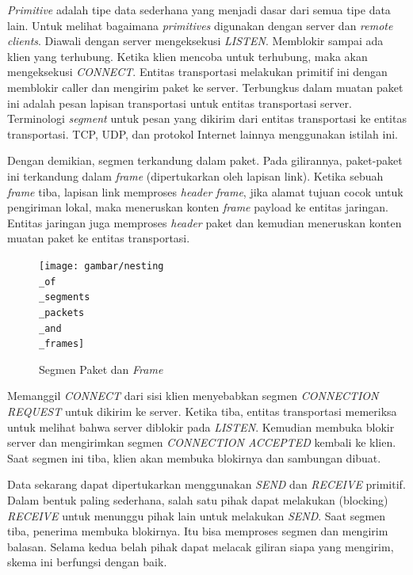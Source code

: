 \emph{Primitive} adalah tipe data sederhana yang menjadi dasar dari semua tipe data lain. Untuk melihat bagaimana \emph{primitives} digunakan dengan server dan \emph{remote clients}. Diawali dengan server mengeksekusi \emph{LISTEN}. Memblokir sampai ada klien yang terhubung. Ketika klien mencoba untuk terhubung, maka akan mengeksekusi \emph{CONNECT}. Entitas transportasi melakukan primitif ini dengan memblokir caller dan mengirim paket ke server. Terbungkus dalam muatan paket ini adalah pesan lapisan transportasi untuk entitas transportasi server. Terminologi \emph{segment} untuk pesan yang dikirim dari entitas transportasi ke entitas transportasi. TCP, UDP, dan protokol Internet lainnya menggunakan istilah ini.

Dengan demikian, segmen terkandung dalam paket. Pada gilirannya, paket-paket ini terkandung dalam \emph{frame} (dipertukarkan oleh lapisan link). Ketika sebuah \emph{frame} tiba, lapisan link memproses \emph{header frame}, jika alamat tujuan cocok untuk pengiriman lokal, maka meneruskan konten \emph{frame} payload ke entitas jaringan. Entitas jaringan juga memproses \emph{header} paket dan kemudian meneruskan konten muatan paket ke entitas transportasi.

\begin{figure}[H]
  \centering{}
	\texttt{[image: gambar/nesting\\\_of\\\_segments\\\_packets\\\_and\\\_frames]}
  \caption{Segmen Paket dan \emph{Frame}}
\end{figure}

Memanggil \emph{CONNECT} dari sisi klien menyebabkan segmen \emph{CONNECTION REQUEST} untuk dikirim ke server. Ketika tiba, entitas transportasi memeriksa untuk melihat bahwa server diblokir pada \emph{LISTEN}. Kemudian membuka blokir server dan mengirimkan segmen \emph{CONNECTION ACCEPTED} kembali ke klien. Saat segmen ini tiba, klien akan membuka blokirnya dan sambungan dibuat.

Data sekarang dapat dipertukarkan menggunakan \emph{SEND} dan \emph{RECEIVE} primitif. Dalam bentuk paling sederhana, salah satu pihak dapat melakukan (blocking) \emph{RECEIVE} untuk menunggu pihak lain untuk melakukan \emph{SEND}. Saat segmen tiba, penerima membuka blokirnya. Itu bisa memproses segmen dan mengirim balasan. Selama kedua belah pihak dapat melacak giliran siapa yang mengirim, skema ini berfungsi dengan baik.

